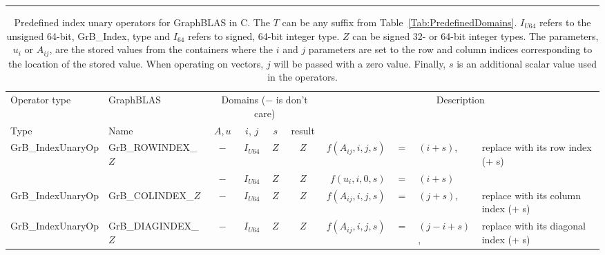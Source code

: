 \begin{landscape}

\begin{table}
\hspace{-2.5em}\begin{threeparttable}
\hrule
\vspace{1\baselineskip}
\caption{Predefined index unary operators for GraphBLAS in C.  The $T$ can be
any suffix from Table~\ref{Tab:PredefinedDomains}. $I_{U64}$ refers to the 
unsigned 64-bit, {\sf GrB\_Index}, type and $I_{64}$ refers to signed, 64-bit 
integer type. $Z$ can be signed 32- or 64-bit integer types.  
The parameters, $u_i$ or $A_{ij}$, are the stored values from the containers 
where the $i$ and $j$ parameters are set to the row and column indices 
corresponding to the location of the stored value. When operating on vectors, 
$j$ will be passed with a zero value. Finally, $s$ is an additional scalar 
value used in the operators. 
}
\label{Tab:PredefIndexOperators}
\vspace{1\baselineskip}

\begin{tabular}{l|l|cccc|rcll}
Operator type             & GraphBLAS                & \multicolumn{4}{c|}{Domains ($-$ is don't care)}& \multicolumn{4}{c}{Description} \\ 
Type                      & Name                     & $A,u$ & $i$, $j$  & $s$ & result                & &&& \\ \hline
{\sf GrB\_IndexUnaryOp}   & {\sf GrB\_ROWINDEX\_$Z$} & $-$   & $I_{U64}$ & $Z$ & $Z$ & $f(A_{ij},i,j,s)$ & $=$ & $(i + s)$, & replace with its row index (+ s) \\
                          &                          & $-$   & $I_{U64}$ & $Z$ & $Z$ & $f(u_{i}, i,0,s)$ & $=$ & $(i + s)$  & \\
{\sf GrB\_IndexUnaryOp}   & {\sf GrB\_COLINDEX\_$Z$} & $-$   & $I_{U64}$ & $Z$ & $Z$ & $f(A_{ij},i,j,s)$ & $=$ & $(j + s)$, & replace with its column index (+ s) \\
{\sf GrB\_IndexUnaryOp}   & {\sf GrB\_DIAGINDEX\_$Z$}& $-$   & $I_{U64}$ & $Z$ & $Z$ & $f(A_{ij},i,j,s)$ & $=$ & $(j - i + s)$, & replace with its diagonal index (+ s) \\
\hline


\end{tabular}
\end{threeparttable}
\end{table}
\end{landscape}
